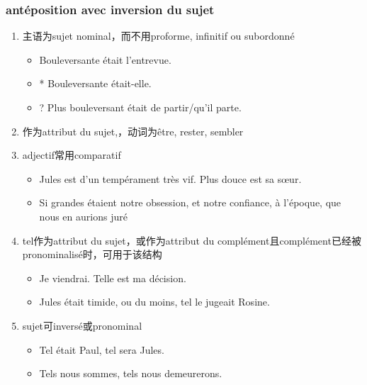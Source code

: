 \documentclass[UTF8]{report}
\begin{document}
\subsubsection{antéposition avec inversion du sujet }
\begin{enumerate}
    \item 主语为sujet nominal，而不用proforme, infinitif ou subordonné
    \begin{itemize}
        \item Bouleversante était l’entrevue.
        \item * Bouleversante était-elle.
        \item ? Plus bouleversant était de partir/qu’il parte.
    \end{itemize}
    \item 作为attribut du sujet,，动词为être, rester, sembler
    \item adjectif常用comparatif
    \begin{itemize}
        \item Jules est d’un tempérament très vif. Plus douce est sa sœur.
        \item Si grandes étaient notre obsession, et notre confiance, à l’époque, que nous en aurions juré
    \end{itemize}
    \item tel作为attribut du sujet，或作为attribut du complément且complément已经被pronominalisé时，可用于该结构
    \begin{itemize}
        \item Je viendrai. Telle est ma décision.
        \item Jules était timide, ou du moins, tel le jugeait Rosine.
    \end{itemize}
    \item sujet可inversé或pronominal
    \begin{itemize}
        \item Tel était Paul, tel sera Jules.
        \item Tels nous sommes, tels nous demeurerons.
    \end{itemize}
\end{enumerate}
\end{document}
